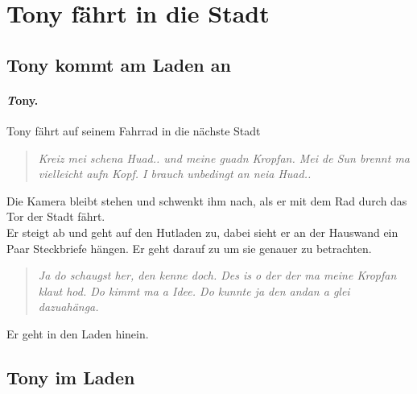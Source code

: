\documentclass[script_part_two.tex]{subfiles}
\begin{document}
\section{Tony fährt in die Stadt}
\subsection{Tony kommt am Laden an}
\paragraph{\emph{T}ony.\\}
Tony fährt auf seinem Fahrrad in die nächste Stadt

\begin{verse}
\textit{\glqq Kreiz mei schena Huad.. und meine guadn Kropfan.
Mei de Sun brennt ma vielleicht aufn Kopf. I brauch unbedingt an neia Huad..\glqq}
\end{verse}

Die Kamera bleibt stehen und schwenkt ihm nach, als er mit dem Rad durch das Tor der Stadt fährt.\\
Er steigt ab und geht auf den Hutladen zu, dabei sieht er an der Hauswand ein Paar Steckbriefe hängen. Er geht darauf zu um sie genauer zu betrachten.

\begin{verse}
\textit{\glqq Ja do schaugst her, den kenne doch. Des is o der der ma meine Kropfan klaut hod. Do kimmt ma a Idee. Do kunnte ja den andan a glei dazuahänga.\grqq}
\end{verse}

Er geht in den Laden hinein.

\subsection{Tony im Laden}
\end{document}
